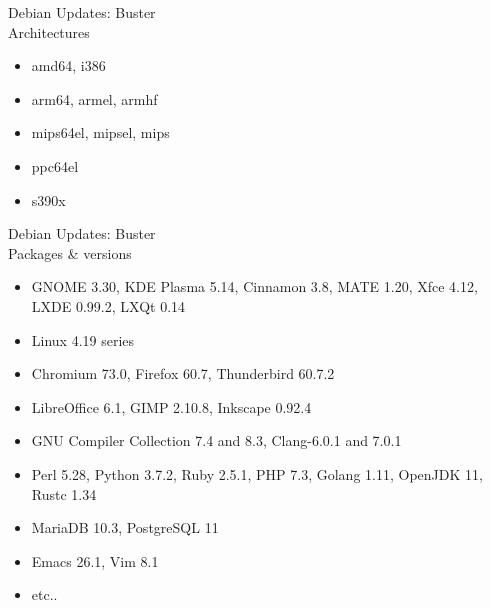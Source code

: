 \documentclass[cjk,c,squeeze,shrink,dvipdfmx,12pt]{beamer}
\begin{document}

\begin{frame}[fragile]{%
    Debian Updates: Buster%
    \\[-.5em]{\normalsize{Architectures}}
  }
  \begin{itemize}
  \item amd64, i386
  \item arm64, armel, armhf
  \item mips64el, mipsel, mips
  \item ppc64el
  \item s390x
  \end{itemize}
\end{frame}

\begin{frame}[fragile]{%
    Debian Updates: Buster%
    \\[-.5em]{\normalsize{Packages \& versions}}
  }
  \begin{itemize}
  \item GNOME 3.30, KDE Plasma 5.14, Cinnamon 3.8, MATE 1.20, Xfce 4.12, LXDE 0.99.2, LXQt 0.14
  \item Linux 4.19 series
  \item Chromium 73.0, Firefox 60.7, Thunderbird 60.7.2
  \item LibreOffice 6.1, GIMP 2.10.8, Inkscape 0.92.4
  \item GNU Compiler Collection 7.4 and 8.3, Clang-6.0.1 and 7.0.1
  \item Perl 5.28, Python 3.7.2, Ruby 2.5.1, PHP 7.3, Golang 1.11, OpenJDK 11, Rustc 1.34
  \item MariaDB 10.3, PostgreSQL 11
  \item Emacs 26.1, Vim 8.1
  \item etc..
  \end{itemize}
\end{frame}
\end{document}
